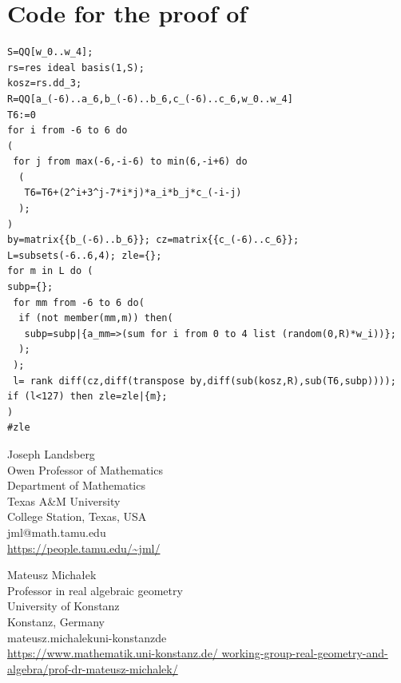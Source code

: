 \documentclass{toc}
\begin{document}
 \section{Code for the proof of }\label{codesect}
\begin{verbatim}
S=QQ[w_0..w_4];
rs=res ideal basis(1,S);
kosz=rs.dd_3;
R=QQ[a_(-6)..a_6,b_(-6)..b_6,c_(-6)..c_6,w_0..w_4] 
T6:=0
for i from -6 to 6 do
(
 for j from max(-6,-i-6) to min(6,-i+6) do
  ( 
   T6=T6+(2^i+3^j-7*i*j)*a_i*b_j*c_(-i-j)
  ); 
)
by=matrix{{b_(-6)..b_6}}; cz=matrix{{c_(-6)..c_6}};
L=subsets(-6..6,4); zle={};
for m in L do (
subp={};
 for mm from -6 to 6 do(
  if (not member(mm,m)) then(
   subp=subp|{a_mm=>(sum for i from 0 to 4 list (random(0,R)*w_i))};
  );
 );
 l= rank diff(cz,diff(transpose by,diff(sub(kosz,R),sub(T6,subp))));
if (l<127) then zle=zle|{m};
)
#zle
\end{verbatim}


%
%
%
%


%
%
%
%
%
\begin{tocauthors}
%
\begin{tocinfo}[landsberg] %
Joseph Landsberg\\
 Owen Professor of Mathematics\\
 Department of Mathematics\\  
 Texas A\&M  University\\
 College Station, Texas, USA\\
 jml@math.tamu.edu \\   %
 \url{https://people.tamu.edu/~jml/}      %
\end{tocinfo}
%
\begin{tocinfo}[michalek]  %
  Mateusz Micha{\l}ek\\
  Professor in real algebraic geometry\\
  University of Konstanz\\
  Konstanz, Germany\\
  mateusz.michalek\tocat{}uni-konstanz\tocdot{}de \\
    \href{https://www.mathematik.uni-konstanz.de/working-group-real-geometry-and-algebra/prof-dr-mateusz-michalek/}{https://www.mathematik.uni-konstanz.de/ \newline working-group-real-geometry-and-algebra/prof-dr-mateusz-michalek/}
\end{tocinfo}
\end{tocauthors}
\end{document}
